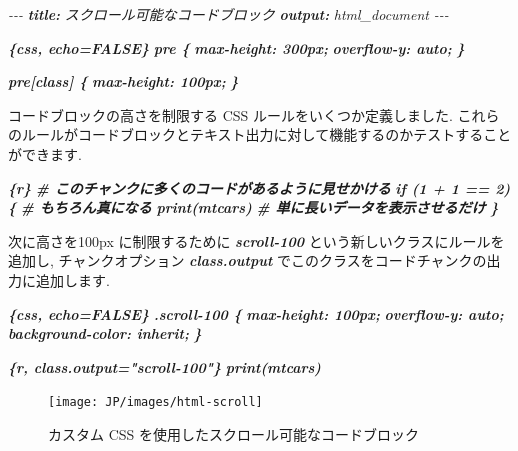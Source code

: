 \documentclass[
  11pt,
  lualatex,ja=standard,jafont=noto]{bxjsreport}
\newenvironment{Shaded}{\begin{snugshade}}{\end{snugshade}}
\newcommand{\AnnotationTok}[1]{\textcolor[rgb]{0.56,0.35,0.01}{\textbf{\textit{#1}}}}
\newcommand{\CommentTok}[1]{\textcolor[rgb]{0.56,0.35,0.01}{\textit{#1}}}
\newcommand{\InformationTok}[1]{\textcolor[rgb]{0.56,0.35,0.01}{\textbf{\textit{#1}}}}
\newcommand{\NormalTok}[1]{#1}
\begin{document}
\begin{Shaded}
\begin{Highlighting}[]
\CommentTok{{-}{-}{-}}
\AnnotationTok{title:}\CommentTok{ スクロール可能なコードブロック}
\AnnotationTok{output:}\CommentTok{ html\_document}
\CommentTok{{-}{-}{-}}

\InformationTok{\textasciigrave{}\textasciigrave{}\textasciigrave{}\{css, echo=FALSE\}}
\InformationTok{pre \{}
\InformationTok{  max{-}height: 300px;}
\InformationTok{  overflow{-}y: auto;}
\InformationTok{\}}

\InformationTok{pre[class] \{}
\InformationTok{  max{-}height: 100px;}
\InformationTok{\}}
\InformationTok{\textasciigrave{}\textasciigrave{}\textasciigrave{}}

\NormalTok{コードブロックの高さを制限する CSS ルールをいくつか定義しました. これらのルールがコードブロックとテキスト出力に対して機能するのかテストすることができます.}

\InformationTok{\textasciigrave{}\textasciigrave{}\textasciigrave{}\{r\}}
\InformationTok{\# このチャンクに多くのコードがあるように見せかける}
\InformationTok{if (1 + 1 == 2) \{}
\InformationTok{  \# もちろん真になる}
\InformationTok{  print(mtcars)}
\InformationTok{  \# 単に長いデータを表示させるだけ}
\InformationTok{\}}
\InformationTok{\textasciigrave{}\textasciigrave{}\textasciigrave{}}

\NormalTok{次に高さを100px に制限するために }\InformationTok{\textasciigrave{}scroll{-}100\textasciigrave{}}\NormalTok{ という新しいクラスにルールを追加し,  チャンクオプション }\InformationTok{\textasciigrave{}class.output\textasciigrave{}}\NormalTok{ でこのクラスをコードチャンクの出力に追加します.}

\InformationTok{\textasciigrave{}\textasciigrave{}\textasciigrave{}\{css, echo=FALSE\}}
\InformationTok{.scroll{-}100 \{}
\InformationTok{  max{-}height: 100px;}
\InformationTok{  overflow{-}y: auto;}
\InformationTok{  background{-}color: inherit;}
\InformationTok{\}}
\InformationTok{\textasciigrave{}\textasciigrave{}\textasciigrave{}}

\InformationTok{\textasciigrave{}\textasciigrave{}\textasciigrave{}\{r, class.output="scroll{-}100"\}}
\InformationTok{print(mtcars)}
\InformationTok{\textasciigrave{}\textasciigrave{}\textasciigrave{}}
\end{Highlighting}
\end{Shaded}

\begin{figure}

{\centering \texttt{[image: JP/images/html-scroll]} 

}

\caption{カスタム CSS を使用したスクロール可能なコードブロック}\label{fig:html-scroll}
\end{figure}
\end{document}

